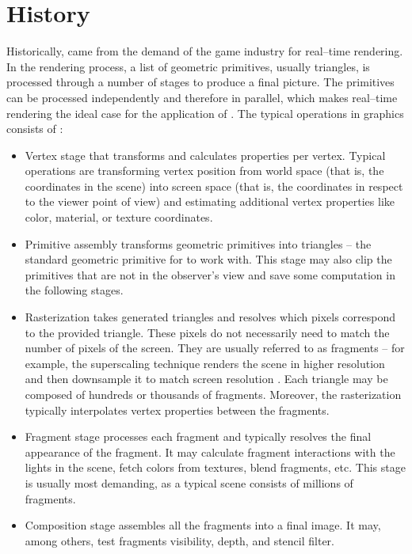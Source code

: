 \section{History}

Historically, \gpu came from the demand of the game industry for real--time rendering. In the rendering process, a list of geometric primitives, usually triangles, is processed through a number of stages to produce a final picture. The primitives can be processed independently and therefore in parallel, which makes real--time rendering the ideal case for the application of \gpu. The typical operations in graphics consists of \citep{GPUComputingOwens}:
\begin{itemize}
    \item Vertex stage that transforms and calculates properties per vertex. Typical operations are transforming vertex position from world space (that is, the coordinates in the scene) into screen space (that is, the coordinates in respect to the viewer point of view) and estimating additional vertex properties like color, material, or texture coordinates.
    \item Primitive assembly transforms geometric primitives into triangles -- the standard geometric primitive for \gpu to work with. This stage may also clip the primitives that are not in the observer's view and save some computation in the following stages.
    \item Rasterization takes generated triangles and resolves which pixels correspond to the provided triangle. These pixels do not necessarily need to match the number of pixels of the screen. They are usually referred to as fragments -- for example, the superscaling technique renders the scene in higher resolution and then downsample it to match screen resolution \citep{GameGraphicProgramming}. Each triangle may be composed of hundreds or thousands of fragments. Moreover, the rasterization typically interpolates vertex properties between the fragments.
    \item Fragment stage processes each fragment and typically resolves the final appearance of the fragment. It may calculate fragment interactions with the lights in the scene, fetch colors from textures, blend fragments, etc. This stage is usually most demanding, as a typical scene consists of millions of fragments.
    \item Composition stage assembles all the fragments into a final image. It may, among others, test fragments visibility, depth, and stencil filter.
\end{itemize}

